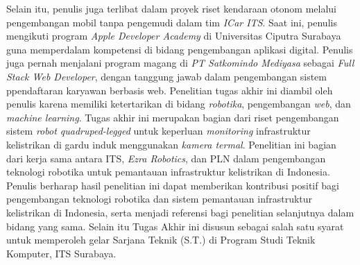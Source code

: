 Selain itu, penulis juga terlibat dalam proyek riset kendaraan otonom melalui pengembangan mobil tanpa pengemudi dalam tim \emph{ICar ITS}. Saat ini, penulis mengikuti program \emph{Apple Developer Academy} di Universitas Ciputra Surabaya guna memperdalam kompetensi di bidang pengembangan aplikasi digital. Penulis juga pernah menjalani program magang di \emph{PT Satkomindo Mediyasa} sebagai \emph{Full Stack Web Developer}, dengan tanggung jawab dalam pengembangan sistem ppendaftaran karyawan berbasis web. Penelitian tugas akhir ini diambil oleh penulis karena memiliki ketertarikan di bidang \emph{robotika}, pengembangan \emph{web}, dan \emph{machine learning}. Tugas akhir ini merupakan bagian dari riset pengembangan sistem \emph{robot quadruped-legged} untuk keperluan \emph{monitoring} infrastruktur kelistrikan di gardu induk menggunakan \emph{kamera termal}. Penelitian ini bagian dari kerja sama antara ITS, \emph{Ezra Robotics}, dan PLN dalam pengembangan teknologi robotika untuk pemantauan infrastruktur kelistrikan di Indonesia. Penulis berharap hasil penelitian ini dapat memberikan kontribusi positif bagi pengembangan teknologi robotika dan sistem pemantauan infrastruktur kelistrikan di Indonesia, serta menjadi referensi bagi penelitian selanjutnya dalam bidang yang sama. Selain itu Tugas Akhir ini disusun sebagai salah satu syarat untuk memperoleh gelar Sarjana Teknik (S.T.) di Program Studi Teknik Komputer, ITS Surabaya.